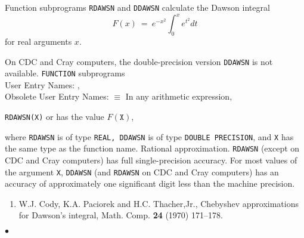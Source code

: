                          
                   
\Submitter{}                             
                       
Function subprograms {\tt RDAWSN} and {\tt DDAWSN} calculate the
Dawson integral
$$ F(x) \ = \ e^{-x^2}\int^x_0 e^{t^2} dt $$
for real arguments $x$.
\par
On CDC and Cray computers, the double-precision version
{\tt DDAWSN} is not available.
\Structure
{\tt FUNCTION} subprograms\\
User Entry Names: ,  \\
Obsolete User Entry Names:  $\equiv$ 
\Usage
In any arithmetic expression,
\begin{center}
{\tt RDAWSN(X)} \quad or  \quad has the value \quad
$F(\mathtt{X})$,
\end{center}
where {\tt RDAWSN} is of type {\tt REAL, DDAWSN} is of type {\tt DOUBLE
PRECISION}, and {\tt X} has the same type as the function name.
\Method
Rational approximation.
\Accuracy
{\tt RDAWSN} (except on CDC and Cray computers)
has full single-precision accuracy.
For most values of the argument {\tt X}, {\tt DDAWSN}
(and {\tt RDAWSN} on CDC and Cray computers) has an accuracy of
approximately one significant digit less than the machine precision.
\Refer
\begin{enumerate}
\item W.J. Cody, K.A. Paciorek and H.C. Thacher,Jr.,
Chebyshev approximations for Dawson's integral,
Math. Comp. {\bf 24} (1970) 171--178.
\end{enumerate}
$\bullet$

